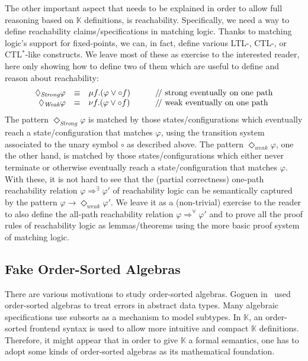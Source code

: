 \documentclass[UTF8,11pt]{article}
\theoremstyle{plain}
\theoremstyle{definition}
\theoremstyle{remark}
\newcommand{\K}{\mbox{$\mathbb{K}$}\xspace}
\newcommand{\doubleslash}{/\!/{ }}
\begin{document}
The other important aspect that needs to be explained in order to allow
full reasoning based on \K definitions, is reachability.
Specifically, we need a way to define reachability claims/specifications
in matching logic.
Thanks to matching logic's support for fixed-points, we can, in fact,
define various LTL-, CTL-, or CTL$^*$-like constructs.
We leave most of these as exercise to the interested reader,
here only showing how to define two of them which are useful to define
and reason about reachability:
$$
\begin{array}{rcl@{\hspace*{7ex}}l}
\Diamond_{\textit{Strong}} \varphi & \equiv & \mu f . (\varphi \vee \circ f)
& \textrm{\doubleslash strong eventually on one path}
\\
\Diamond_{\textit{Weak}} \varphi & \equiv & \nu f . (\varphi \vee \circ f)
& \textrm{\doubleslash weak eventually on one path}
\end{array}
$$
The pattern $\Diamond_{\textit{Strong}}\varphi$ is matched by those
states/configurations which eventually reach a state/configuration that
matches $\varphi$, using the transition system associated to the unary
symbol $\circ$ as described above.
The pattern $\Diamond_{\textit{weak}}\varphi$, one the other hand, is matched
by those states/configurations which either never terminate or otherwise
eventually reach a state/configuration that matches $\varphi$.
With these, it is not hard to see that the (partial correctness) one-path
reachability relation $\varphi \Rightarrow^\exists \varphi'$ of reachability
logic \cite{stefanescu-park-yuwen-li-rosu-2016-oopsla} can be semantically
captured by the pattern
$\varphi \rightarrow \Diamond_{\textit{weak}}\varphi'$.
We leave it as a (non-trivial) exercise to the reader to also define the
all-path reachability relation $\varphi \Rightarrow^\forall\varphi'$ and to
prove all the proof rules of reachability logic as lemmas/theorems using the
more basic proof system of matching logic.

\subsection{Fake Order-Sorted Algebras}
\label{sec:dealing-with-OS}

There are various motivations to study order-sorted algebras.
Goguen in~\cite{Goguen1991types} used order-sorted algebras to treat errors in 
abstract data types.
Many algebraic specifications use {subsorts} as a mechanism to model 
subtypes.
In \K, an order-sorted frontend syntax is used to allow more intuitive and 
compact \K definitions.
Therefore, it might appear that in order to give \K a formal semantics, 
one has to adopt some kinds of order-sorted algebras as its mathematical 
foundation.
\end{document}
